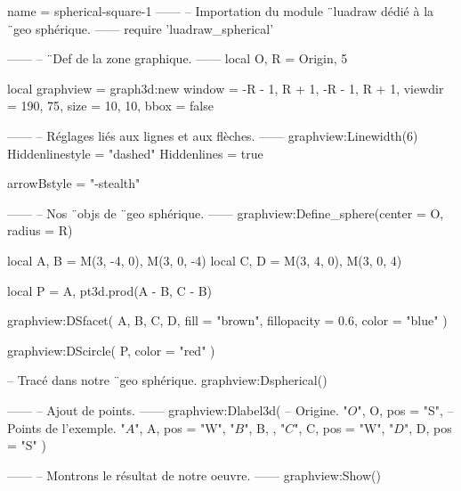 \documentclass[border = 3pt]{standalone}
\begin{document}
\begin{luadraw}{name = spherical-square-1}
------
-- Importation du module ¨luadraw dédié à la ¨geo sphérique.
------
require 'luadraw_spherical'

------
-- ¨Def de la zone graphique.
------
local O, R = Origin, 5

local graphview = graph3d:new{
  window  = {-R - 1, R + 1, -R - 1, R + 1},
  viewdir = {190, 75},
  size    = {10, 10},
  bbox    = false
}

------
-- Réglages liés aux lignes et aux flèches.
------
graphview:Linewidth(6)
Hiddenlinestyle = "dashed"
Hiddenlines     = true

arrowBstyle = "-stealth"

------
-- Nos ¨objs de ¨geo sphérique.
------
graphview:Define_sphere({center = O, radius = R})

local A, B = M(3, -4, 0), M(3, 0, -4)
local C, D = M(3, 4, 0), M(3, 0, 4)

local P = {A, pt3d.prod(A - B, C - B)}

graphview:DSfacet(
  {A, B, C, D},
  {fill = "brown", fillopacity = 0.6, color = "blue"}
)

graphview:DScircle(
  P,
  {color = "red"}
)

-- Tracé dans notre ¨geo sphérique.
graphview:Dspherical()

------
-- Ajout de points.
------
graphview:Dlabel3d(
-- Origine.
  "$O$", O, {pos = "S"},
-- Points de l'exemple.
  "$A$", A, {pos = "W"},
  "$B$", B, {},
  "$C$", C, {pos = "W"},
  "$D$", D, {pos = "S"}
)

------
-- Montrons le résultat de notre oeuvre.
------
graphview:Show()
\end{luadraw}
\end{document}
